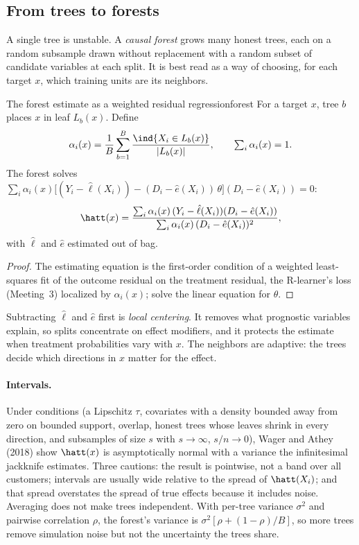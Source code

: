 \documentclass[11pt]{article}
\begin{document}
\subsection{From trees to forests}

A single tree is unstable. A \emph{causal forest} grows many honest trees, each on a random subsample drawn
without replacement with a random subset of candidate variables at each split. It is best read as a way of
choosing, for each target $x$, which training units are its neighbors.

\begin{prop}{The forest estimate as a weighted residual regression}{forest}
For a target $x$, tree $b$ places $x$ in leaf $L_b(x)$. Define
\[
  \alpha_i(x) = \frac1B\sum_{b=1}^B \frac{\ind{X_i \in L_b(x)}}{|L_b(x)|}, \qquad \textstyle\sum_i \alpha_i(x) = 1 .
\]
The forest solves $\sum_i \alpha_i(x)\big[(Y_i - \hat\ell(X_i)) - (D_i - \hat e(X_i))\,\theta\big](D_i - \hat e(X_i)) = 0$:
\[
  \hatt(x) = \frac{\sum_i \alpha_i(x)\,(Y_i - \hat\ell(X_i))(D_i - \hat e(X_i))}{\sum_i \alpha_i(x)\,(D_i - \hat e(X_i))^2},
\]
with $\hat\ell$ and $\hat e$ estimated out of bag.
\end{prop}
\begin{proof}
The estimating equation is the first-order condition of a weighted least-squares fit of the outcome residual on the
treatment residual, the R-learner's loss (Meeting~3) localized by $\alpha_i(x)$; solve the linear equation for
$\theta$.
\end{proof}

Subtracting $\hat\ell$ and $\hat e$ first is \emph{local centering}. It removes what prognostic variables explain, so
splits concentrate on effect modifiers, and it protects the estimate when treatment probabilities vary with $x$.
The neighbors are adaptive: the trees decide which directions in $x$ matter for the effect.

\paragraph{Intervals.} Under conditions (a Lipschitz $\tau$, covariates with a density bounded away from zero on
bounded support, overlap, honest trees whose leaves shrink in every direction, and subsamples of size $s$ with
$s \to \infty$, $s/n \to 0$), Wager and Athey (2018) show $\hatt(x)$ is asymptotically normal with a variance the
infinitesimal jackknife estimates. Three cautions: the result is pointwise, not a band over all customers;
intervals are usually wide relative to the spread of $\hatt(X_i)$; and that spread overstates the spread of
true effects because it includes noise. Averaging does not make trees independent. With per-tree variance
$\sigma^2$ and pairwise correlation $\rho$, the forest's variance is $\sigma^2[\rho + (1-\rho)/B]$, so more trees
remove simulation noise but not the uncertainty the trees share.
\end{document}
